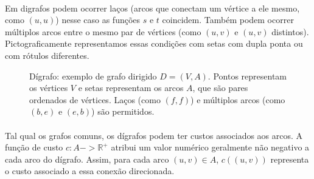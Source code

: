 \documentclass[12pt,a4paper]{article}
\def\to{->}%
\begin{document}
\paragraph{}
Em digrafos podem ocorrer laços (arcos que conectam um vértice a ele mesmo, como \((u, u)\)) nesse caso as funções \(s\) e \(t\) coincidem. Também podem ocorrer múltiplos arcos entre o mesmo par de vértices (como \((u, v)\) e \((u, v)\) distintos). Pictograficamente representamos essas condições com setas com dupla ponta ou com rótulos diferentes.

\begin{figure}[H]
\centering
{}
\caption{Dígrafo: exemplo de grafo dirigido \(D=(V,A)\). Pontos representam os vértices \(V\) e setas representam os arcos \(A\), que são pares ordenados de vértices. Laços (como \((f,f)\)) e múltiplos arcos (como \((b,e)\) e \((e,b)\)) são permitidos.}
\label{fig:def-digrafo-simples}
\end{figure}       

\paragraph{}
Tal qual os grafos comuns, os dígrafos podem ter custos associados aos arcos. A função de custo \(c: A \to \mathbb{R}^+\) atribui um valor numérico geralmente não negativo a cada arco do dígrafo. Assim, para cada arco \((u, v) \in A\), \(c((u, v))\) representa o custo associado a essa conexão direcionada.
\end{document}
